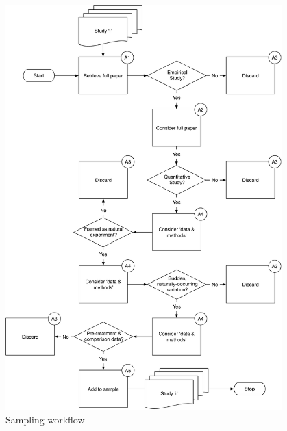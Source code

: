 \begin{figure}
	\begin{small}
		\begin{center}
			\includegraphics[width=0.95\textwidth]{exhibits/sampling_workflow.pdf}
		\end{center}
		\caption{Sampling workflow}
		\label{fig:sampling_workflow}
	\end{small}
\end{figure}


